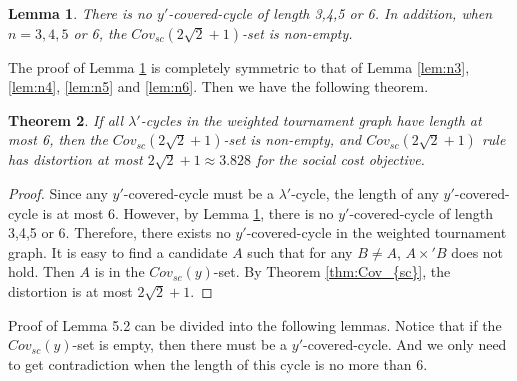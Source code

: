 \documentclass[11pt]{article}
\newtheorem{theorem}{Theorem}[section]
\newtheorem{lemma}[theorem]{Lemma}
\theoremstyle{remark}
\begin{document}
\begin{lemma}\label{lem:the}
There is no $y'$-covered-cycle of length 3,4,5 or 6.  In addition, when $n=3,4,5$ or 6, the $Cov_{sc}(2\sqrt2+1)$-set is non-empty.
\end{lemma}
The proof of Lemma \ref{lem:the} is completely symmetric to that of Lemma \ref{lem:n3}, \ref{lem:n4}, \ref{lem:n5} and \ref{lem:n6}. Then we have the following theorem.

 \begin{theorem}
 If all $\lambda'$-cycles in the weighted tournament graph have length at most 6, then the $Cov_{sc}(2\sqrt2+1)$-set is non-empty, and $Cov_{sc}(2\sqrt2+1)$ rule has distortion at most $2\sqrt2+1\approx 3.828$ for the social cost objective.
\end{theorem}

\begin{proof}
Since any $y'$-covered-cycle must be a $\lambda'$-cycle,  the length of any $y'$-covered-cycle is at most 6. However, by Lemma \ref{lem:the}, there is no $y'$-covered-cycle of length 3,4,5 or 6. Therefore, there exists no $y'$-covered-cycle in the weighted tournament graph. It is easy to find a candidate $A$ such that for any $B\neq A$, $A\times' B$ does not hold. Then $A$ is in the $Cov_{sc}(y)$-set. By Theorem \ref{thm:Cov_{sc}}, the distortion is at most $2\sqrt2+1$.

%
%
\end{proof}

Proof of Lemma 5.2 can be divided into the following lemmas. Notice that if the $Cov_{sc}(y)$-set is empty, then there must be a $y'$-covered-cycle. And we only need to get contradiction when the length of this cycle is no more than 6.
\end{document}
